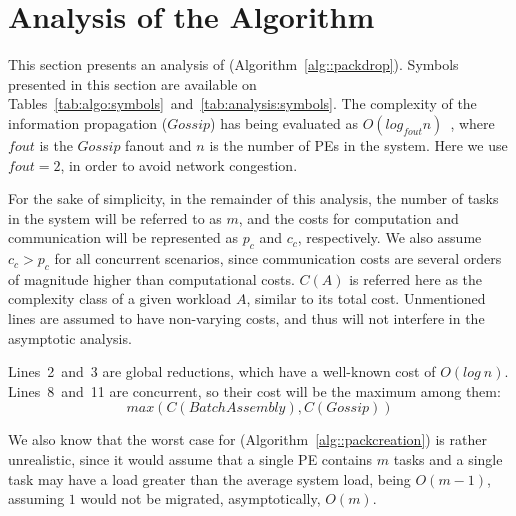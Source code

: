 \section{Analysis of the Algorithm} \label{sec:analysis}

This section presents an analysis of \packdrop (Algorithm~\ref{alg::packdrop}). 
Symbols presented in this section are available on Tables~\ref{tab:algo:symbols}~and~\ref{tab:analysis:symbols}.
The complexity of the information propagation ($Gossip$) has being evaluated as $O(log_{fout}n)$~\cite{grapevine},
where $fout$ is the $Gossip$ fanout and $n$ is the number of PEs in the system.
Here we use $fout=2$, in order to avoid network congestion. 

For the sake of simplicity, in the remainder of this analysis, the number of tasks in the system
will be referred to as $m$, and the costs for computation and communication will be represented as $p_c$ and $c_c$, respectively.
We also assume $c_c > p_c$ for all concurrent scenarios, since communication costs are several orders of magnitude higher than computational costs.
$C(A)$ is referred here as the complexity class of a given workload $A$, similar to its total cost.
Unmentioned lines are assumed to have non-varying costs, and thus will not interfere in the asymptotic analysis.

Lines~2~and~3 are global reductions, which have a well-known cost of $O(log\ n)$.
Lines~8~and~11 are concurrent, so their cost will be the maximum among them:
\begin{equation}
  max(C(BatchAssembly),C(Gossip))
\end{equation}

We also know that the worst case for \batchassembly (Algorithm~\ref{alg::packcreation}) is rather unrealistic, 
since it would assume that a single PE contains $m$ tasks and a single task may have a load greater than the average system load, being $O(m-1)$, assuming $1$ would not be migrated, asymptotically, $O(m)$.

\begin{table}[t]
	\caption{List of symbols used in the Analysis of the Algorithm.}
	\centering	
	\label{tab:analysis:symbols}
\end{table}

